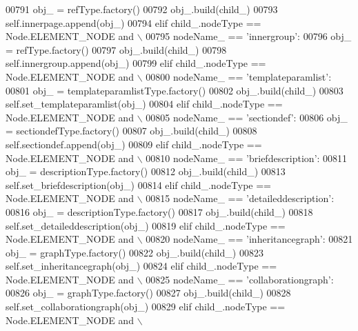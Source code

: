 \begin{DoxyCode}
{{{{{{{{{{{{{{{{{{{{{{{{{{{{{{{{{{{00791             obj\_ = refType.factory()
00792             obj\_.build(child\_)
00793             self.innerpage.append(obj\_)
00794         \textcolor{keywordflow}{elif} child\_.nodeType == Node.ELEMENT\_NODE \textcolor{keywordflow}{and} \(\backslash\)
00795             nodeName\_ == \textcolor{stringliteral}{'innergroup'}:
00796             obj\_ = refType.factory()
00797             obj\_.build(child\_)
00798             self.innergroup.append(obj\_)
00799         \textcolor{keywordflow}{elif} child\_.nodeType == Node.ELEMENT\_NODE \textcolor{keywordflow}{and} \(\backslash\)
00800             nodeName\_ == \textcolor{stringliteral}{'templateparamlist'}:
00801             obj\_ = templateparamlistType.factory()
00802             obj\_.build(child\_)
00803             self.set_templateparamlist(obj\_)
00804         \textcolor{keywordflow}{elif} child\_.nodeType == Node.ELEMENT\_NODE \textcolor{keywordflow}{and} \(\backslash\)
00805             nodeName\_ == \textcolor{stringliteral}{'sectiondef'}:
00806             obj\_ = sectiondefType.factory()
00807             obj\_.build(child\_)
00808             self.sectiondef.append(obj\_)
00809         \textcolor{keywordflow}{elif} child\_.nodeType == Node.ELEMENT\_NODE \textcolor{keywordflow}{and} \(\backslash\)
00810             nodeName\_ == \textcolor{stringliteral}{'briefdescription'}:
00811             obj\_ = descriptionType.factory()
00812             obj\_.build(child\_)
00813             self.set_briefdescription(obj\_)
00814         \textcolor{keywordflow}{elif} child\_.nodeType == Node.ELEMENT\_NODE \textcolor{keywordflow}{and} \(\backslash\)
00815             nodeName\_ == \textcolor{stringliteral}{'detaileddescription'}:
00816             obj\_ = descriptionType.factory()
00817             obj\_.build(child\_)
00818             self.set_detaileddescription(obj\_)
00819         \textcolor{keywordflow}{elif} child\_.nodeType == Node.ELEMENT\_NODE \textcolor{keywordflow}{and} \(\backslash\)
00820             nodeName\_ == \textcolor{stringliteral}{'inheritancegraph'}:
00821             obj\_ = graphType.factory()
00822             obj\_.build(child\_)
00823             self.set_inheritancegraph(obj\_)
00824         \textcolor{keywordflow}{elif} child\_.nodeType == Node.ELEMENT\_NODE \textcolor{keywordflow}{and} \(\backslash\)
00825             nodeName\_ == \textcolor{stringliteral}{'collaborationgraph'}:
00826             obj\_ = graphType.factory()
00827             obj\_.build(child\_)
00828             self.set_collaborationgraph(obj\_)
00829         \textcolor{keywordflow}{elif} child\_.nodeType == Node.ELEMENT\_NODE \textcolor{keywordflow}{and} \(\backslash\)
}}}}}}}}}}}}}}}}}}}}}}}}}}}}}}}}}}}
\end{DoxyCode}
